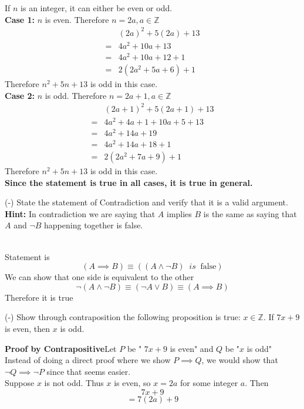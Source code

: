 \documentclass{exam}
\begin{document}
\begin{questions}
\begin{solution}
If $n$ is an integer, it can either be even or odd.\\
\textbf{Case 1:} $n$ is even. Therefore $n=2a, a\in \mathbb{Z}$
\begin{align*}
    &(2a)^2 + 5(2a) + 13 \\
    =&4a^2 + 10a + 13 \\
    =&4a^2+10a + 12 + 1 \\
    =&2(2a^2 + 5a+6) + 1
\end{align*}
Therefore $n^2+5n+13$ is odd in this case. \\
\textbf{Case 2:} $n$ is odd. Therefore $n=2a+1, a\in \mathbb{Z}$
\begin{align*}
    &(2a+1)^2 + 5(2a+1) + 13 \\
    =&4a^2 + 4a+1 + 10a+5 + 13 \\
    =&4a^2+14a + 19 \\
    =&4a^2+14a + 18+1 \\
    =&2(2a^2 + 7a+9) + 1
\end{align*}
Therefore $n^2+5n+13$ is odd in this case. \\

\textbf{Since the statement is true in all cases, it is true in general.}

 \end{solution}
\question (-) State the statement of Contradiction and verify that it is a valid argument.\\
\textbf{Hint:} In contradiction we are saying that $A$ implies $B$ is the same as saying that $A$ and $\neg B$ happening together is false.
\begin{solution} 
\\
Statement is 
\[(A \implies B ) \equiv ((A \land \neg B) \;\; is \;\; \text{false})\]
We can show that one side is equivalent to the other
\begin{equation*}
    \neg (A \land \neg B) \equiv (\neg A \lor B) \equiv (A \implies B)
\end{equation*}
Therefore it is true
\end{solution}


\question (-) Show through contraposition the following proposition is true: $x \in \mathbb{Z}$. If $7x + 9$ is even, then $x$ is odd.


\begin{solution}
\textbf{Proof by Contrapositive}\newline Let $P$ be " $7x+9$ is even" and $Q$ be "$x$ is odd" \newline
Instead of doing a direct proof where we show $P\implies Q$, we would show that $\neg Q \implies \neg P$ since that seems easier.\\
Suppose $x$ is not odd. \newline
Thus $x$ is even, so $x = 2a$ for some integer $a$.\newline
Then
\begin{equation}
7x + 9    
\end{equation}
\begin{equation}
 = 7(2a) + 9   
\end{equation}


\end{solution}
\end{questions}
\end{document}
